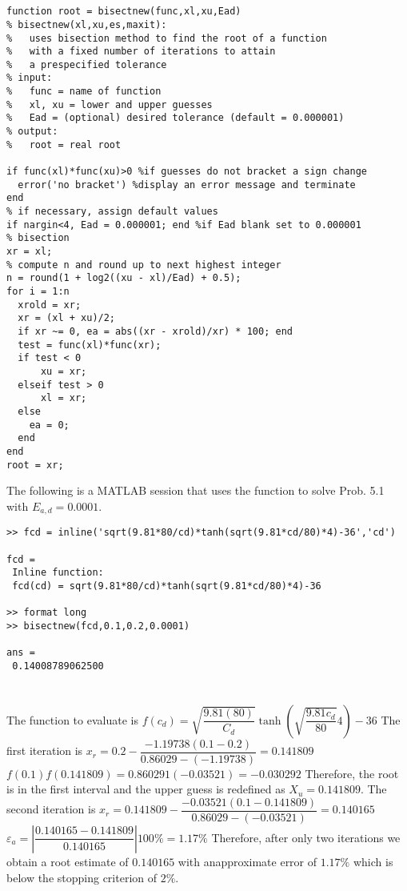 \documentclass[../main.tex]{subfiles}
\begin{document}
\section{}
\begin{lstlisting}[numbers=none]
function root = bisectnew(func,xl,xu,Ead)
% bisectnew(xl,xu,es,maxit):
%   uses bisection method to find the root of a function
%   with a fixed number of iterations to attain
%   a prespecified tolerance
% input:
%   func = name of function
%   xl, xu = lower and upper guesses
%   Ead = (optional) desired tolerance (default = 0.000001)
% output:
%   root = real root

if func(xl)*func(xu)>0 %if guesses do not bracket a sign change
  error('no bracket') %display an error message and terminate
end
% if necessary, assign default values
if nargin<4, Ead = 0.000001; end %if Ead blank set to 0.000001
% bisection
xr = xl;
% compute n and round up to next highest integer
n = round(1 + log2((xu - xl)/Ead) + 0.5);
for i = 1:n
  xrold = xr;
  xr = (xl + xu)/2;
  if xr ~= 0, ea = abs((xr - xrold)/xr) * 100; end
  test = func(xl)*func(xr);
  if test < 0
 	  xu = xr;
  elseif test > 0
 	  xl = xr;
  else
    ea = 0;
  end
end
root = xr;
\end{lstlisting}
\bigbreak
The following is a MATLAB session that uses the function to solve Prob. 5.1 with $E_{a,d} = 0.0001.$
\bigbreak
\begin{lstlisting}[numbers=none]
>> fcd = inline('sqrt(9.81*80/cd)*tanh(sqrt(9.81*cd/80)*4)-36','cd')

fcd =
 Inline function:
 fcd(cd) = sqrt(9.81*80/cd)*tanh(sqrt(9.81*cd/80)*4)-36
 
>> format long
>> bisectnew(fcd,0.1,0.2,0.0001)

ans =
 0.14008789062500
\end{lstlisting}
\bigbreak

\section{}
The function to evaluate is
\bigbreak
$f\left(c_{d}\right)=\sqrt{\dfrac{9.81(80)}{C_{d}}} \tanh \left(\sqrt{\dfrac{9.81 c_{d}}{80}} 4\right)-36$
\bigbreak
The first iteration is
\bigbreak
$x_{r}=0.2-\dfrac{-1.19738(0.1-0.2)}{0.86029-(-1.19738)}=0.141809$
\bigbreak
$f(0.1) f(0.141809)=0.860291(-0.03521)=-0.030292$
\bigbreak
Therefore, the root is in the first interval and the upper guess is redefined as $X_{u}=0.141809$. 
\smallbreak
The second iteration is
\bigbreak
$x_{r}=0.141809-\dfrac{-0.03521(0.1-0.141809)}{0.86029-(-0.03521)}=0.140165$
\bigbreak
$\varepsilon_{a}=\left|\dfrac{0.140165-0.141809}{0.140165}\right| 100 \%=1.17 \%$
\bigbreak
Therefore, after only two iterations we obtain a root estimate of $0.140165$ with an\smallbreak approximate error of $1.17 \%$ which is below the stopping criterion of $2 \%$.
\bigbreak
\end{document}
